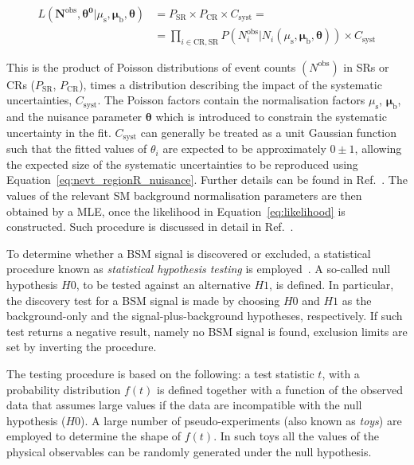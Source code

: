 			\begin{equation}
				\begin{split}
					L \left ( \bm{N}^{\mathrm{obs}}, \bm{\theta^0} | \mu_\mathrm{s}, \bm{\mu_{\mathrm{b}}, \theta} \right ) & = P_{\mathrm{SR}} \times P_{\mathrm{CR}} \times C_{\mathrm{syst}} = \\
					& = \prod_{i \in \mathrm{CR, SR}} P \left ( N_i^{\mathrm{obs}} | N_i \left( \mu_\mathrm{s}, \bm{\mu_{\mathrm{b}}, \theta} \right) \right ) \times C_{\mathrm{syst}}
				\end{split}
				\label{eq:likelihood}
			\end{equation}

			\noindent This is the product of Poisson distributions of event counts $\left ( {N}^{\mathrm{obs}} \right )$ in \acp{SR} or \acp{CR} ($P_{\mathrm{SR}}$, $P_{\mathrm{CR}}$), times a distribution describing the impact of the systematic uncertainties, $C_{\mathrm{syst}}$. The Poisson factors contain the normalisation factors $\mu_\mathrm{s}$, $\bm{\mu_{\mathrm{b}}}$, and the nuisance parameter $\bm{\theta}$ which is introduced to constrain the systematic uncertainty in the fit. $C_{\mathrm{syst}}$ can generally be treated as a unit Gaussian function such that the fitted values of $\theta_i$ are expected to be approximately $0\pm1$, allowing the expected size of the systematic uncertainties to be reproduced using Equation~\ref{eq:nevt_regionR_nuisance}. Further details can be found in Ref.~\cite{histfitter}. The values of the relevant \ac{SM} background normalisation parameters are then obtained by a \ac{MLE}, once the likelihood in Equation~\ref{eq:likelihood} is constructed. Such procedure is discussed in detail in Ref.~\cite{cowan1998statistical}.

			To determine whether a \ac{BSM} signal is discovered or excluded, a statistical procedure known as \emph{statistical hypothesis testing} is employed~\cite{Cowan2015}. A so-called null hypothesis $H0$, to be tested against an alternative $H1$, is defined. In particular, the discovery test for a \ac{BSM} signal is made by choosing $H0$ and $H1$ as the background-only and the signal-plus-background hypotheses, respectively. If such test returns a negative result, namely no \ac{BSM} signal is found, exclusion limits are set by inverting the procedure. 

			The testing procedure is based on the following: a test statistic $t$, with a probability distribution $f(t)$ is defined together with a function of the observed data that assumes large values if the data are incompatible with the null hypothesis ($H0$). A large number of pseudo-experiments (also known as \emph{toys}) are employed to determine the shape of $f(t)$. In such toys all the values of the physical observables can be randomly generated under the null hypothesis. %

